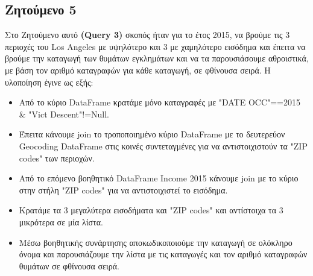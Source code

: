 \documentclass{article}
\begin{document}


\subsection{Ζητούμενο 5}
\label{subsec:Z5}

Στο Ζητούμενο αυτό \textbf{(Query 3)}  σκοπός ήταν για το έτος 2015, να βρούμε τις 3 περιοχές του  Los Angeles  με υψηλότερο και 3 με χαμηλότερο εισόδημα και έπειτα να βρούμε την καταγωγή των θυμάτων εγκλημάτων και να τα παρουσιάσουμε αθροιστικά, με βάση τον αριθμό καταγραφών για κάθε καταγωγή, σε φθίνουσα σειρά. Η υλοποίηση έγινε ως εξής: 
\begin{itemize}
    \item   Από το κύριο  DataFrame  κρατάμε μόνο καταγραφές με  "DATE OCC"==2015 \& "Vict Descent"!=Null.
    \item   Έπειτα κάνουμε  join  το τροποποιημένο κύριο  DataFrame  με το δευτερεύον  Geocoding DataFrame στις κοινές συντεταγμένες για να αντιστοιχιστούν τα  "ZIP codes"  των περιοχών. 
    \item   Από το επόμενο βοηθητικό  DataFrame Income 2015  κάνουμε join  με το κύριο στην στήλη  "ZIP codes"  για να αντιστοιχιστεί το εισόδημα. 
    \item   Κρατάμε τα 3 μεγαλύτερα εισοδήματα και  "ZIP codes"  και αντίστοιχα τα 3 μικρότερα σε μία λίστα. 
    \item   Μέσω βοηθητικής συνάρτησης αποκωδικοποιούμε την καταγωγή σε ολόκληρο όνομα και παρουσιάζουμε την λίστα με τις καταγωγές και τον αριθμό καταγραφών θυμάτων σε φθίνουσα σειρά. 
\end{itemize}
\end{document}
